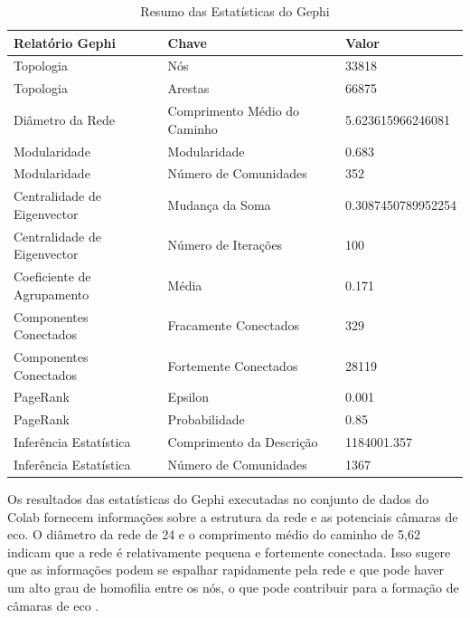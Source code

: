 \begin{table}[h]
	\centering
	\caption{Resumo das Estatísticas do Gephi}
	\label{tab:colab_gephi_statistics}
	\begin{tabular}{|l|l|l|}
		\hline
		\textbf{Relatório Gephi}    & \textbf{Chave}               & \textbf{Valor}     \\
		\hline
		Topologia                   & Nós                          & 33818              \\
		Topologia                   & Arestas                      & 66875              \\
		Diâmetro da Rede            & Comprimento Médio do Caminho & 5.623615966246081  \\
		Modularidade                & Modularidade                 & 0.683              \\
		Modularidade                & Número de Comunidades        & 352                \\
		Centralidade de Eigenvector & Mudança da Soma              & 0.3087450789952254 \\
		Centralidade de Eigenvector & Número de Iterações          & 100                \\
		Coeficiente de Agrupamento  & Média                        & 0.171              \\
		Componentes Conectados      & Fracamente Conectados        & 329                \\
		Componentes Conectados      & Fortemente Conectados        & 28119              \\
		PageRank                    & Epsilon                      & 0.001              \\
		PageRank                    & Probabilidade                & 0.85               \\
		Inferência Estatística      & Comprimento da Descrição     & 1184001.357        \\
		Inferência Estatística      & Número de Comunidades        & 1367               \\
		\hline
	\end{tabular}
\end{table}

Os resultados das estatísticas do Gephi executadas no conjunto de dados do Colab fornecem informações sobre a estrutura da rede e as potenciais câmaras de eco. O diâmetro da rede de 24 e o comprimento médio do caminho de 5,62 indicam que a rede é relativamente pequena e fortemente conectada. Isso sugere que as informações podem se espalhar rapidamente pela rede e que pode haver um alto grau de homofilia entre os nós, o que pode contribuir para a formação de câmaras de eco \cite[]{2012_Kadushin_BOOK}.

